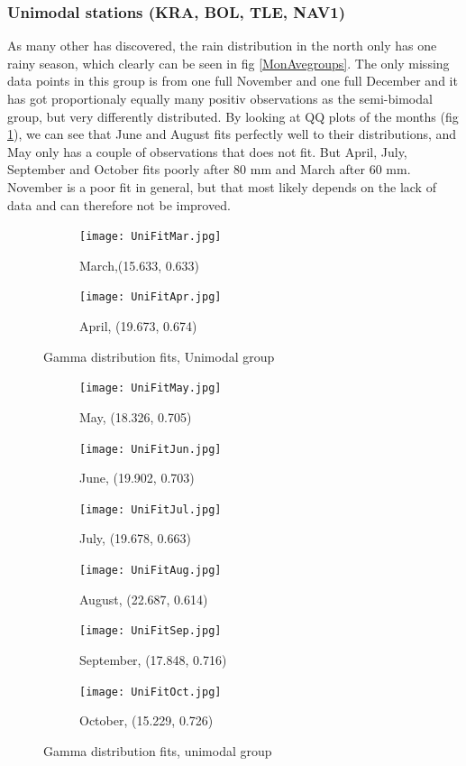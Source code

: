 \documentclass{article}
\begin{document}
	\subsubsection{Unimodal stations (KRA, BOL, TLE, NAV1)}
	As many other has discovered, the rain distribution in the north only has one rainy season, which clearly can be seen in fig \ref{MonAvegroups}. The only missing data points in this group is from one full November and one full December and it has got proportionaly equally many positiv observations as the semi-bimodal group, but very differently distributed. By looking at QQ plots of the months (fig \ref{GammaFitUni}), we can see that June and August fits perfectly well to their distributions, and May only has a couple of observations that does not fit. But April, July, September and October fits poorly after 80 mm and March after 60 mm. November is a poor fit in general, but that most likely depends on the lack of data and can therefore not be improved. 
	\begin{figure}[H]
		\ContinuedFloat*
		\centering
		\begin{subfigure}{0.5\textwidth}
			\centering
			\texttt{[image: UniFitMar.jpg]}
			\caption{March,(15.633, 0.633) }
		\end{subfigure}%
		\begin{subfigure}{0.5\textwidth}
			\centering
			\texttt{[image: UniFitApr.jpg]}
			\caption{April, (19.673, 0.674)}
		\end{subfigure}
		\caption{Gamma distribution fits, Unimodal group}
		\label{GammaFitUni}
	\end{figure}
	\begin{figure}[H]
		\ContinuedFloat
		\centering
		\begin{subfigure}{0.5\textwidth}
			\centering
			\texttt{[image: UniFitMay.jpg]}
			\caption{May, (18.326, 0.705)}
		\end{subfigure}%
		\begin{subfigure}{0.5\textwidth}
			\centering
			\texttt{[image: UniFitJun.jpg]}
			\caption{June, (19.902, 0.703) }
		\end{subfigure}
		\begin{subfigure}{0.5\textwidth}
			\centering
			\texttt{[image: UniFitJul.jpg]}
			\caption{July, (19.678, 0.663)}
		\end{subfigure}%
		\begin{subfigure}{0.5\textwidth}
			\centering
			\texttt{[image: UniFitAug.jpg]}
			\caption{August, (22.687, 0.614)}
		\end{subfigure}
		\begin{subfigure}{0.5\textwidth}
			\centering
			\texttt{[image: UniFitSep.jpg]}
			\caption{September, (17.848, 0.716)}
		\end{subfigure}%
		\begin{subfigure}{0.5\textwidth}
			\centering
			\texttt{[image: UniFitOct.jpg]}
			\caption{October, (15.229, 0.726)}
		\end{subfigure}
		\caption{Gamma distribution fits, unimodal group}
	\end{figure}
\end{document}
